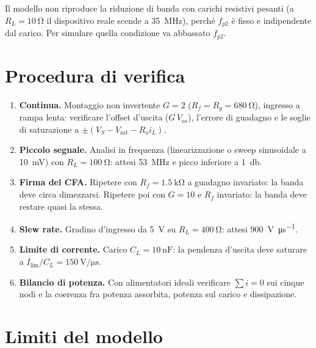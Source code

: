 \documentclass[11pt,a4paper]{article}
\begin{document}
Il modello non riproduce la riduzione di banda con carichi resistivi
pesanti (a $R_L=\SI{10}{\ohm}$ il dispositivo reale scende a
\SI{35}{\mega\hertz}), perché $f_{p2}$ è fisso e indipendente dal carico.
Per simulare quella condizione va abbassato $f_{p2}$.

\section{Procedura di verifica}

\begin{enumerate}
\item \textbf{Continua.} Montaggio non invertente $G=2$
  ($R_f=R_g=\SI{680}{\ohm}$), ingresso a rampa lenta: verificare l'offset
  d'uscita ($G\,V_{os}$), l'errore di guadagno e le soglie di saturazione a
  $\pm(V_S - V_{\mathrm{sat}} - R_o i_L)$.
\item \textbf{Piccolo segnale.} Analisi in frequenza (linearizzazione o
  sweep sinusoidale a \SI{10}{\milli\volt}) con $R_L=\SI{100}{\ohm}$:
  attesi \SI{53}{\mega\hertz} e picco inferiore a \SI{1}{\decibel}.
\item \textbf{Firma del CFA.} Ripetere con $R_f=\SI{1.5}{\kilo\ohm}$ a
  guadagno invariato: la banda deve circa dimezzarsi. Ripetere poi con
  $G=10$ e $R_f$ invariato: la banda deve restare quasi la stessa.
\item \textbf{Slew rate.} Gradino d'ingresso da \SI{5}{\volt} su
  $R_L=\SI{400}{\ohm}$: attesi \SI{900}{\volt\per\micro\second}.
\item \textbf{Limite di corrente.} Carico $C_L=\SI{10}{\nano\farad}$: la
  pendenza d'uscita deve saturare a $I_{\mathrm{lim}}/C_L =
  \SI{150}{\volt\per\micro\second}$.
\item \textbf{Bilancio di potenza.} Con alimentatori ideali verificare
  $\sum i = 0$ sui cinque nodi e la coerenza fra potenza assorbita, potenza
  sul carico e dissipazione.
\end{enumerate}

\section{Limiti del modello}
\end{document}
